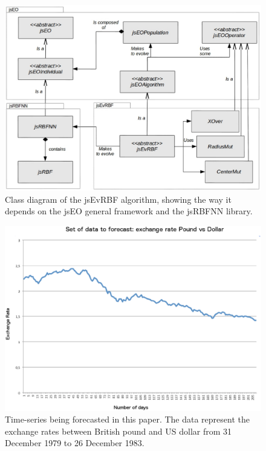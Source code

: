 \documentclass{article}
\begin{document}
\begin{figure}[!ht]
\includegraphics[width=120mm]{class-diagram.eps}
\caption{Class diagram of the jsEvRBF algorithm, showing the way it depends on the jsEO general framework and the jsRBFNN library.}
\label{fig:class_diagram} %
\end{figure}

\newpage
\clearpage

\begin{figure}[!ht]
\includegraphics[width=120mm]{time-series.eps}
\caption{Time-series being forecasted in this paper. The data represent the exchange rates between British pound and US dollar from 31 December 1979 to 26 December 1983\cite{Sheta2001}.}
\label{fig:time-series}
\end{figure}
\end{document}
